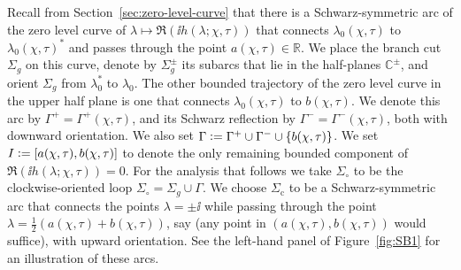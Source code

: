 Recall from Section~\ref{sec:zero-level-curve} that there is a Schwarz-symmetric arc of the zero level curve of $\lambda\mapsto \Re(\ii h(\lambda;\chi,\tau))$ that connects $\lambda_0(\chi,\tau)$ to $\lambda_0(\chi,\tau)^*$ and passes through the point $a(\chi,\tau)\in\mathbb{R}$. We place the branch cut $\Sigma_g$ on this curve, denote by $\Sigma_g^{\pm}$ its subarcs that lie in the half-planes $\mathbb{C}^{\pm}$, and orient $\Sigma_g$ from $\lambda_0^*$ to $\lambda_0$. The other bounded trajectory of the zero level curve in the upper half plane is one that connects $\lambda_0(\chi,\tau)$ to $b(\chi,\tau)$. We denote this arc by $\Gamma^+ = \Gamma^+(\chi,\tau)$, and its Schwarz reflection by $\Gamma^- = \Gamma^-(\chi,\tau)$, both with downward orientation. We also set $\Gamma\vcentcolon=  \Gamma^+ \cup \Gamma^- \cup \{  b(\chi,\tau) \}$. We set $I\vcentcolon= [a(\chi,\tau), b(\chi,\tau)]$ to
denote the only remaining bounded component of $\Re(\ii h(\lambda;\chi,\tau))=0$.
For the analysis that follows we take $\Sigma_\circ$ to be the clockwise-oriented loop $\Sigma_{\circ} = \Sigma_g \cup \Gamma$. We choose $\Sigma_\mathrm{c}$  to be a Schwarz-symmetric arc that connects the points $\lambda=\pm \ii$ while passing through the point $\lambda=\tfrac{1}{2}(a(\chi,\tau)+b(\chi,\tau))$, say (any point in $(a(\chi,\tau),b(\chi,\tau))$ would suffice), with upward orientation. See the left-hand panel of Figure~\ref{fig:SB1} for an illustration of these arcs.









